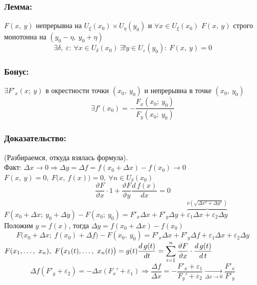 \documentclass[12pt, letterpaper, twoside]{article}
\newcommand{\DS}{\displaystyle}
\begin{document}
    \subsubsection*{Лемма:}
    $F(x,\ y)$ непрерывна на $U_{\xi}(x_0) \times U_{\eta}(y_0)$ и $\forall x\in U_{\xi}(x_0)$ $F(x,\ y)$ строго монотонна на $(y_0 - \eta,\ y_0 + \eta)$
    \[\exists \delta,\ \varepsilon:\ \forall x\in U_{\delta}(x_0)\ \exists! y\in U_{\varepsilon}(y_0):\ F(x,\ y) = 0\]
    \subsubsection*{Бонус:}
    $\exists F'_x(x;\ y)$ в окрестности точки $(x_0,\ y_0)$ и непрерывна в точке $(x_0,\ y_0)$
    \[\exists f'(x_0) = -\frac{F_x(x_0;\ y_0)}{F_y(x_0;\ y_0)}\]
    \newpage\subsubsection*{Доказательство:}
    (Разбираемся, откуда взялась формула).\\
    Факт: $\Delta x\to 0\Rightarrow \Delta y = \Delta f = f(x_0 + \Delta x) - f(x_0)\to 0$\\
    $F(x,\ y) = 0,\ F\big(x,\ f(x)\big) = 0,\ \forall n\in U_{\delta}(x_0)$
    \[\frac{\vartheta F}{\vartheta x}\cdot 1 + \frac{\vartheta F}{\vartheta y}\frac{d\, f(x)}{dx} = 0\]
    $F(x_0 + \Delta x;\ y_0 + \Delta y) - F(x_0;\ y_0) = F'_x\Delta x + F'_y\Delta y + \overset{\overline{o}\left(\sqrt{\Delta x^2 + \Delta y^2}\right)}{\overbrace{\varepsilon_1 \Delta x + \varepsilon_2 \Delta y}}$\\
    Положим $y = f(x)$, тогда $\Delta y = f(x_0 + \Delta x) - f(x_0)$
    \[F\big(x_0 + \Delta x;\ f(x_0) + \Delta f\big) - F(x_0,\ y_0) = F'_x\Delta x + F'_y\Delta f + \varepsilon_1 \Delta x + \varepsilon_2 \Delta y\]
    $\DS F(x_1,\dots,\ x_n),\ F\big(x_1(t),\dots,\ x_n(t) \big) = g(t)\\
    \frac{d\, g(t)}{dt} = \sum_{i = 1}^{n} \frac{\vartheta F}{\vartheta x}\cdot \frac{d\, g(t)}{d\, t}$
    \[\Delta f (F'_y + \varepsilon_2) = -\Delta x(F_x' + \varepsilon_1)\Rightarrow \frac{\Delta f}{\Delta x} = -\frac{F'_x + \varepsilon_1}{F_y' + \varepsilon_2}\xrightarrow[\Delta x\to 0]{}\frac{F'_x}{F'_y}\]
\end{document}

